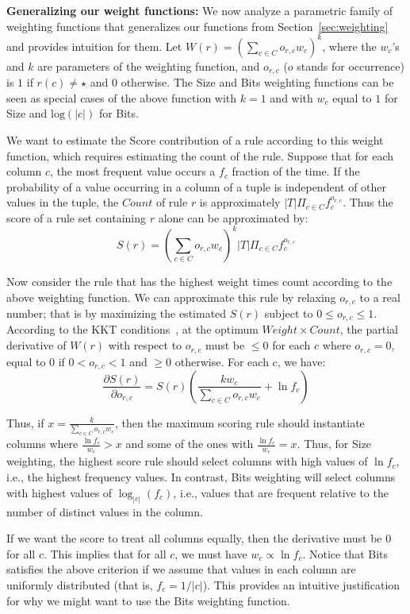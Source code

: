 \documentclass[10pt,journal,compsoc]{IEEEtran}
\newcounter{prob}
\begin{document}
{{\noindent
\textbf{Generalizing our weight functions:} We now analyze a parametric family of weighting functions that generalizes our functions from Section~\ref{sec:weighting} and provides intuition for them. Let $W(r) = \left(\sum_{c \in C} o_{r,c}w_c\right)^k$, where the $w_c$'s and $k$ are parameters of the weighting function, and $o_{r,c}$ ($o$ stands for occurrence) is $1$ if $r(c) \neq \star$ and $0$ otherwise. The Size and Bits weighting functions can be seen as special cases of the above function with $k=1$ and with $w_c$ equal to $1$ for Size and $\text{log}(|c|)$ for Bits.

We want to estimate the Score contribution of a rule according to this weight function, which requires estimating the count of the rule. Suppose that for each column $c$, the most frequent value occurs a $f_c$ fraction of the time. If the probability of a value occurring in a column of a tuple is independent of other values in the tuple, the $Count$ of rule $r$ is approximately $|T|\Pi_{c \in C}f_c^{o_{r,c}}$. Thus the score of a rule set containing $r$ alone can be approximated by:
$$S(r) = \left(\sum_{c \in C} o_{r,c}w_c\right)^k|T|\Pi_{c \in C}f_c^{o_{r,c}}$$


Now consider the rule that has the highest weight times count according to the above weighting function. We can approximate this rule by relaxing $o_{r,c}$ to a real number; that is by maximizing the estimated $S(r)$ subject to $0 \leq o_{r,c} \leq 1$. According to the KKT conditions~\cite{Boyd:2004:CO:993483}, at the optimum $Weight \times Count$, the partial derivative of $W(r)$ with respect to $o_{r,c}$ must be $\leq 0$ for each $c$ where $o_{r,c} = 0$, equal to $0$ if $0 < o_{r,c} < 1$ and $\geq 0$ otherwise. For each $c$, we have:
$$\frac{\partial S(r)}{\partial o_{r,c}} = S(r)(\frac{kw_c}{\sum_{c \in C} o_{r,c}w_c} + \ln f_c)$$

Thus, if $x = \frac{k}{\sum_{c \in C} o_{r,c}w_c}$, then the maximum scoring rule should instantiate columns where $\frac{\ln f_c}{w_c} > x$ and some of the ones with $\frac{\ln f_c}{w_c} = x$. Thus, for Size weighting, the highest score rule should select columns with high values of $\ln f_c$, i.e., the highest frequency values. In contrast, Bits weighting will select columns with highest values of $\log_{|c|}(f_c)$, i.e., values that are frequent relative to the number of distinct values in the column.

If we want the score to treat all columns equally, then the derivative must be $0$ for all $c$. This implies that for all $c$, we must have $w_c \propto \ln f_c$. Notice that Bits satisfies the above criterion if we assume that values in each column are uniformly distributed (that is, $f_c = 1/|c|$). This provides an intuitive justification for why we might want to use the Bits weighting function.

}}
\end{document}
